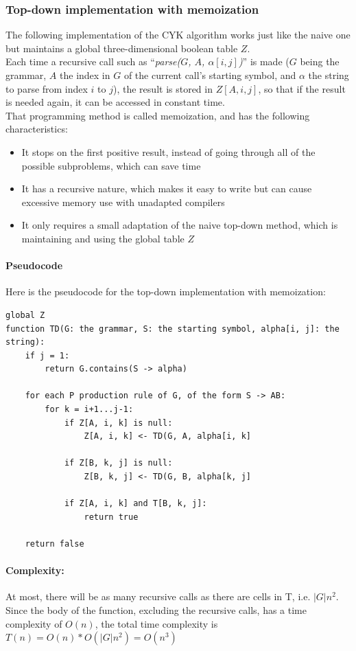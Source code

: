 \documentclass[12pt]{extarticle}
\begin{document}
\begin{multicols}{2}
\subsubsection{Top-down implementation with memoization}
The following implementation of the CYK algorithm works just like the naive one but maintains a global three-dimensional boolean table $Z$.\\
Each time a recursive call such as ``\textit{parse($G$, $A$, $\alpha[i, j]$)}''
is made ($G$ being the grammar, $A$ the index in $G$ of the current call's starting symbol, and $\alpha$ the string to parse from index $i$ to $j$), the result is stored in $Z[A,i,j]$, so that if the result is needed again, it can be accessed in constant time.\\
That programming method is called memoization, and has the following characteristics:
\begin{itemize}
  \item It stops on the first positive result, instead of going through all of the possible subproblems, which can save time
  \item It has a recursive nature, which makes it easy to write but can cause excessive memory use with unadapted compilers
  \item It only requires a small adaptation of the naive top-down method, which is maintaining and using the global table $Z$
\end{itemize}

\paragraph{Pseudocode} Here is the pseudocode for the top-down implementation
with memoization:
\begin{lstlisting}
global Z
function TD(G: the grammar, S: the starting symbol, alpha[i, j]: the string):
    if j = 1:
        return G.contains(S -> alpha)

    for each P production rule of G, of the form S -> AB:
        for k = i+1...j-1:
            if Z[A, i, k] is null:
                Z[A, i, k] <- TD(G, A, alpha[i, k]

            if Z[B, k, j] is null:
                Z[B, k, j] <- TD(G, B, alpha[k, j]

            if Z[A, i, k] and T[B, k, j]:
                return true

    return false
\end{lstlisting}

\paragraph{Complexity:}
At most, there will be as many recursive calls as there are cells in T, i.e.
$|G|n^2$. Since the body of the function, excluding the recursive calls, has a
time complexity of $O(n)$, the total time complexity is $T(n)=O(n)*O(|G|n^2)=O(n^3)$


\end{multicols}
\end{document}
